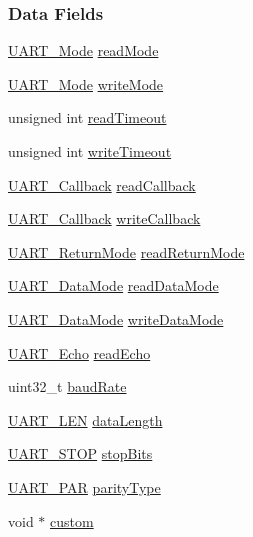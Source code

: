 \subsubsection*{Data Fields}
\begin{DoxyCompactItemize}
\item 
\hyperlink{_u_a_r_t_8h_a2507a620dba95cd20885c52494d19e90}{U\-A\-R\-T\-\_\-\-Mode} \hyperlink{struct_u_a_r_t___params_ab8677572499b3734fcaa00f6431b0e7b}{read\-Mode}
\item 
\hyperlink{_u_a_r_t_8h_a2507a620dba95cd20885c52494d19e90}{U\-A\-R\-T\-\_\-\-Mode} \hyperlink{struct_u_a_r_t___params_a53a95d4c2266d6e7ecea6640baf92d40}{write\-Mode}
\item 
unsigned int \hyperlink{struct_u_a_r_t___params_a10875d91873fb77106bde0b799f961e2}{read\-Timeout}
\item 
unsigned int \hyperlink{struct_u_a_r_t___params_a7a721cf5229c7c41074d262107cae501}{write\-Timeout}
\item 
\hyperlink{_u_a_r_t_8h_a74c489f070c575fb11654fe74302b5b8}{U\-A\-R\-T\-\_\-\-Callback} \hyperlink{struct_u_a_r_t___params_a5457b86b6793f1c4757457b9b22e379d}{read\-Callback}
\item 
\hyperlink{_u_a_r_t_8h_a74c489f070c575fb11654fe74302b5b8}{U\-A\-R\-T\-\_\-\-Callback} \hyperlink{struct_u_a_r_t___params_a0497d8a55aea66d3ab2118f8966e8e33}{write\-Callback}
\item 
\hyperlink{_u_a_r_t_8h_acb5a82843435a1b5d51b6c27028d914f}{U\-A\-R\-T\-\_\-\-Return\-Mode} \hyperlink{struct_u_a_r_t___params_a47382bd027b944868ce873ad71d29d0e}{read\-Return\-Mode}
\item 
\hyperlink{_u_a_r_t_8h_a694090fdb166f94ac30b809f9cba87b8}{U\-A\-R\-T\-\_\-\-Data\-Mode} \hyperlink{struct_u_a_r_t___params_a707659dcecb10f490000511ec2de2060}{read\-Data\-Mode}
\item 
\hyperlink{_u_a_r_t_8h_a694090fdb166f94ac30b809f9cba87b8}{U\-A\-R\-T\-\_\-\-Data\-Mode} \hyperlink{struct_u_a_r_t___params_a02e8b9127a7d6fa49021f01a7ee69ad2}{write\-Data\-Mode}
\item 
\hyperlink{_u_a_r_t_8h_aac6a03c2e1d76f53e1d9d923dcdc24f2}{U\-A\-R\-T\-\_\-\-Echo} \hyperlink{struct_u_a_r_t___params_a61642ef82bbcfc98494739a98afff58a}{read\-Echo}
\item 
uint32\-\_\-t \hyperlink{struct_u_a_r_t___params_afadb98d0a0ef6e17240bab79306e7828}{baud\-Rate}
\item 
\hyperlink{_u_a_r_t_8h_adf245d5f10db0abcbd8ad62a0d80c694}{U\-A\-R\-T\-\_\-\-L\-E\-N} \hyperlink{struct_u_a_r_t___params_adb937e0b27c71886e58953312d3d1376}{data\-Length}
\item 
\hyperlink{_u_a_r_t_8h_a176b71ca19bc13d7534fa30fc18c2243}{U\-A\-R\-T\-\_\-\-S\-T\-O\-P} \hyperlink{struct_u_a_r_t___params_a59f12dc5b7329f484573521c0e2b3d78}{stop\-Bits}
\item 
\hyperlink{_u_a_r_t_8h_ac70b5aa75500b8c45a51ec560deccfc4}{U\-A\-R\-T\-\_\-\-P\-A\-R} \hyperlink{struct_u_a_r_t___params_acaa90dc09cd820477c5bfaae152a2010}{parity\-Type}
\item 
void $\ast$ \hyperlink{struct_u_a_r_t___params_ab4df0d3f6c1e1121f303d11271abb7a1}{custom}
\end{DoxyCompactItemize}


